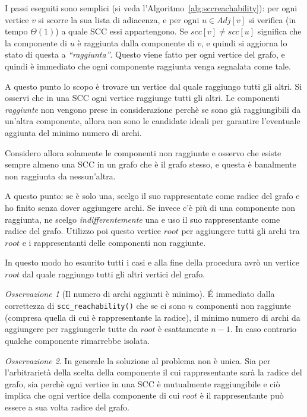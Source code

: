 \documentclass[a4paper,8pt]{article}
\theoremstyle{definition}
\theoremstyle{remark}
\newtheorem{osservazione}{Osservazione}
\begin{document}
I passi eseguiti sono semplici (si veda l'Algoritmo~\ref{alg:sccreachability}): per ogni vertice
$v$ si scorre la sua lista di adiacenza, e per ogni $u\in{Adj[v]}$ si verifica (in tempo $\Theta(1)$)
a quale SCC essi appartengono. Se $scc[v] \neq scc[u]$ significa che la componente di $u$ è
raggiunta dalla componente di $v$, e quindi si aggiorna lo stato di questa a
\emph{``raggiunta''}. Questo viene fatto per ogni vertice del grafo, e quindi è immediato
che ogni componente raggiunta venga segnalata come tale.

\bigskip
A questo punto lo scopo è trovare un vertice dal quale raggiungo tutti gli altri.
Si osservi che in una SCC ogni vertice raggiunge tutti gli altri. Le componenti
\emph{raggiunte} non vengono prese in considerazione perchè se sono già raggiungibili
da un'altra componente, allora non sono le candidate ideali per garantire l'eventuale
aggiunta del minimo numero di archi.

Considero allora solamente le componenti non raggiunte e osservo che esiste sempre
almeno una SCC in un grafo che è il grafo stesso, e questa è banalmente non raggiunta
da nessun'altra.

A questo punto: se è solo una, scelgo il suo rappresentate come radice
del grafo e ho finito senza dover aggiungere archi. Se invece c'è più di una componente
non raggiunta, ne scelgo \emph{indifferentemente} una e uso il suo rappresentante
come radice del grafo. Utilizzo poi questo vertice $root$ per aggiungere tutti gli
archi tra $root$ e i rappresentanti delle componenti non raggiunte.

In questo modo ho esaurito tutti i casi e alla fine della procedura avrò un vertice
$root$ dal quale raggiungo tutti gli altri vertici del grafo.

\begin{osservazione}[Il numero di archi aggiunti è minimo]
  \'E immediato dalla correttezza di \verb!scc_reachability()! che se ci sono $n$
  componenti non raggiunte (compresa quella di cui è rappresentante la radice),
  il minimo numero di archi da aggiungere per raggiungerle tutte da $root$ è esattamente
  $n-1$. In caso contrario qualche componente rimarrebbe isolata.
\end{osservazione}

\begin{osservazione}
  In generale la soluzione al problema non è unica. Sia per l'arbitrarietà della
  scelta della componente il cui rappresentante sarà la radice del grafo, sia perchè
  ogni vertice in una SCC è mutualmente raggiungibile e ciò implica che ogni vertice
  della componente di cui $root$ è il rappresentante può essere a sua volta radice
  del grafo.
\end{osservazione}
\end{document}
